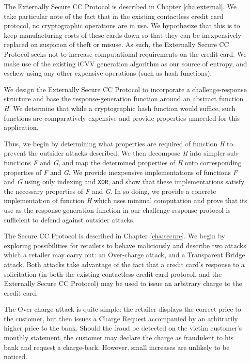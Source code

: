 
The Externally Secure CC Protocol is described in Chapter \ref{cha:external}.
We take particular note of the fact that in the existing contactless credit card protocol, no cryptographic operations are in use.
We hypothesize that this is to keep manufacturing costs of these cards down so that they can be inexpensively replaced on suspicion of theft or misuse.
As such, the Externally Secure CC Protocol seeks not to increase computational requirements on the credit card.
We make use of the existing iCVV generation algorithm as our source of entropy, and eschew using any other expensive operations (such as hash functions).

We design the Externally Secure CC Protocol to incorporate a challenge-response structure and base the response-generation function around an abstract function \emph{H}.
We determine that while a cryptographic hash function would suffice, such functions are comparatively expensive and provide properties unneeded for this application.

Thus, we begin by determining what properties are required of function \emph{H} to prevent the outsider attacks described.
We then decompose \emph{H} into simpler sub-functions \emph{F} and \emph{G}, and map the determined properties of \emph{H} onto corresponding properties of \emph{F} and \emph{G}.
We provide inexpensive implementations of functions \emph{F} and \emph{G} using only indexing and \texttt{XOR},
    and show that these implementations satisfy the necessary properties of \emph{F} and \emph{G}.
In so doing, we provide a concrete implementation of function \emph{H} which uses minimal computation
    and prove that its use as the response-generation function in our challenge-response protocol is sufficient to defend against outsider attacks.


The Secure CC Protocol is described in Chapter \ref{cha:secure}.
We begin by exploring possibilities for retailers to behave maliciously and describe two attacks which a retailer may carry out:
    an Over-charge attack, and a Transparent Bridge attack.
Both attacks take advantage of the fact that a credit card's response to a solicitation
    (in both the existing contactless credit card protocol, and the Externally Secure CC Protocol)
    may be used to issue an arbitrary charge to the credit card.

The Over-charge attack is quite simple:
    the retailer displays the correct price to the customer, but then issues a Charge Request accompanied by an arbitrarily higher price to the bank.
Should the fraud be detected on the victim customer's monthly statement, the customer may declare the charge as fraudulent to his bank and request a charge-back.
However, small increases are unlikely to be noticed.

